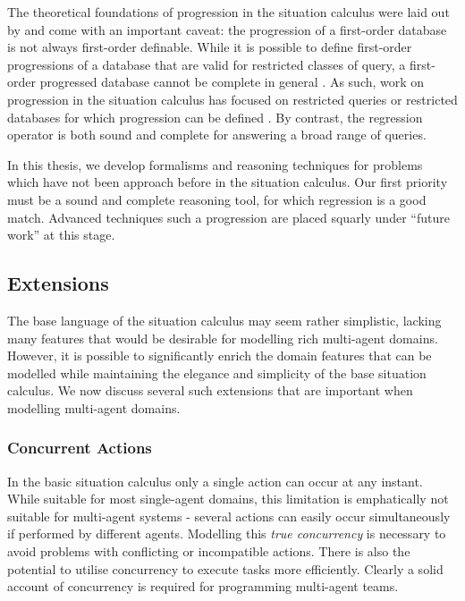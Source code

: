 The theoretical foundations of progression in the situation calculus
were laid out by \citet{reiter97progression} and come with an important
caveat: the progression of a first-order database is not always first-order
definable. While it is possible to define first-order progressions
of a database that are valid for restricted classes of query, a first-order
progressed database cannot be complete in general \citep{vassos08progression_future_queries}.
As such, work on progression in the situation calculus has focused
on restricted queries or restricted databases for which progression
can be defined \citep{liu05sc_progression_knowledge,vassos07progression}.
By contrast, the regression operator is both sound and complete for
answering a broad range of queries.

In this thesis, we develop formalisms and reasoning techniques for
problems which have not been approach before in the situation calculus.
Our first priority must be a sound and complete reasoning tool, for
which regression is a good match. Advanced techniques such a progression
are placed squarly under {}``future work'' at this stage.


\subsection{Extensions}

The base language of the situation calculus may seem rather simplistic,
lacking many features that would be desirable for modelling rich multi-agent
domains. However, it is possible to significantly enrich the domain
features that can be modelled while maintaining the elegance and simplicity
of the base situation calculus. We now discuss several such extensions
that are important when modelling multi-agent domains.


\subsubsection{Concurrent Actions}

In the basic situation calculus only a single action can occur at
any instant. While suitable for most single-agent domains, this limitation
is emphatically not suitable for multi-agent systems - several actions
can easily occur simultaneously if performed by different agents.
Modelling this \emph{true concurrency} is necessary to avoid problems
with conflicting or incompatible actions. There is also the potential
to utilise concurrency to execute tasks more efficiently. Clearly
a solid account of concurrency is required for programming multi-agent
teams.

